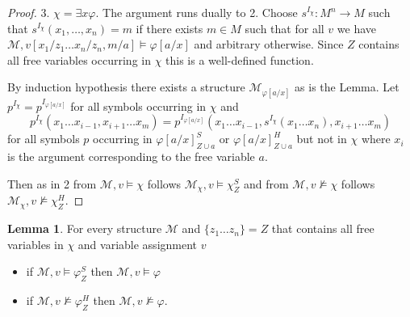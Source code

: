 \documentclass[a4paper,11pt]{report}
\theoremstyle{definition}
\theoremstyle{definition}
\theoremstyle{definition}
\newtheorem{lemma}[theorem]{Lemma}
\theoremstyle{definition}
\theoremstyle{definition}
\theoremstyle{definition}
\theoremstyle{definition}
\begin{document}
\begin{proof}
		3. $\chi = \exists x\varphi$. The argument runs dually to 2. Choose $s^{I_\chi}:M^n\to M$ such that $s^{I_\chi}(x_1,\dots, x_n) = m$ if there exists $m\in M$ such that for all $v$ we have $\mathcal M, v[x_1/z_1\dots x_n/z_n, m/a]\models\varphi[a/x]$ and arbitrary otherwise. Since $Z$ contains all free variables occurring in $\chi$ this is a well-defined function.
		
		By induction hypothesis there exists a structure $\mathcal M_{\varphi[a/x]}$ as is the Lemma. Let $p^{I_\chi} = p^{I_{\varphi[a/x]}}$ for all symbols occurring in $\chi$ and $$p^{I_\chi}(x_1\dots x_{i-1}, x_{i+1}\dots x_m) = p^{I_{\varphi[a/x]}}(x_1\dots x_{i-1}, s^{I_\chi}(x_1\dots x_n), x_{i+1}\dots x_m)$$ for all symbols $p$ occurring in $\varphi[a/x]^S_{Z\cup a}$ or $\varphi[a/x]^H_{Z\cup a}$ but not in $\chi$ where $x_i$ is the argument corresponding to the free variable $a$.
		
		Then as in 2 from $\mathcal M, v\models \chi$ follows $\mathcal M_\chi,v\models\chi^S_Z$ and from $\mathcal M, v\not\models \chi$ follows $\mathcal M_\chi,v\not\models\chi^H_Z$.
	\end{proof}
	
	\begin{lemma}
		For every structure $\mathcal M$ and $\{z_1\dots z_n\} = Z$ that contains all free variables in $\chi$ and variable assignment $v$
		\begin{itemize}
			\item if $\mathcal M, v\models\varphi^S_Z$ then $\mathcal M, v\models \varphi$
			\item if $\mathcal M, v\not\models\varphi^H_Z$ then $\mathcal M, v\not\models\varphi$.
		\end{itemize}
	\end{lemma}
	
\end{document}
